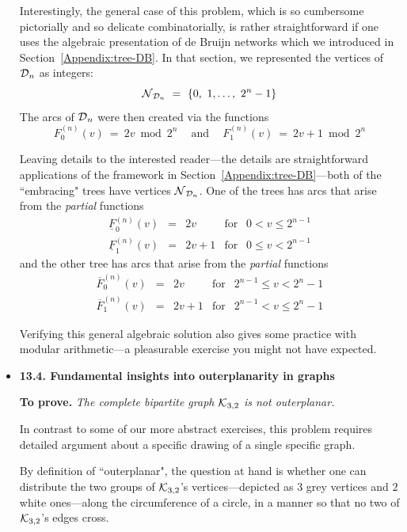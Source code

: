 \begin{itemize}
\medskip

Interestingly, the general case of this problem, which is so cumbersome pictorially and so delicate combinatorially, is rather straightforward if one uses the algebraic presentation of de Bruijn networks which we introduced in Section~\ref{Appendix:tree-DB}.  In that section, we represented the vertices of $\mbox{$\cal D$}_n$ as integers:
\[ \mbox{$\cal N$}_{{\cal D}_n} \ = \ \{ 0, \ 1, \ldots, \ 2^n -1 \} \]
The arcs of $\mbox{$\cal D$}_n$ were then created via the functions
\[ F^{(n)}_0(v) \ = \ 2v \bmod 2^n \ \ \ \ \mbox{ and } \ \ \ \ F^{(n)}_1(v) \ = \ 2v +1 \bmod 2^n \]

\smallskip

Leaving details to the interested reader---the details are straightforward applications of the framework in Section~\ref{Appendix:tree-DB}---both of the ``embracing" trees have vertices 
$\mbox{$\cal N$}_{{\cal D}_n}$.  One of the trees has arcs that arise from the {\em partial} functions
\[ \begin{array}{cccl}
\underline{F}^{(n)}_0(v) & = & 2v & \mbox{for } \ \ 0 < v \leq 2^{n-1} \\
\underline{F}^{(n)}_1(v) & = & 2v+1 & \mbox{for } \ \ 0 \leq v < 2^{n-1}
\end{array}
\]
and the other tree has arcs that arise from the {\em partial} functions
\[ \begin{array}{cccl}
\overline{F}^{(n)}_0(v) & = & 2v & \mbox{for } \ \ 2^{n-1} \leq v < 2^n -1 \\
\overline{F}^{(n)}_1(v) & = & 2v+1 & \mbox{for } \ \ 2^{n-1} < v \leq 2^n -1
\end{array}
\]

\smallskip

Verifying this general algebraic solution also gives some practice with modular arithmetic---a pleasurable exercise you might not have expected.

\medskip\item 
{\bf 13.4. Fundamental insights into outerplanarity in graphs}

\smallskip

{\bf To prove.} {\em The complete bipartite graph $\mbox{$\cal K$}_{3,2}$ is not outerplanar.}

\medskip

In contrast to some of our more abstract exercises, this problem requires detailed argument about a specific drawing of a single specific graph.

\smallskip

By definition of ``outerplanar", the question at hand is whether one can distribute the two groups of $\mbox{$\cal K$}_{3,2}$'s vertices---depicted as $3$ grey vertices and $2$ white ones---along the circumference of a circle, in a manner so that no two of $\mbox{$\cal K$}_{3,2}$'s edges cross.


\end{itemize}
